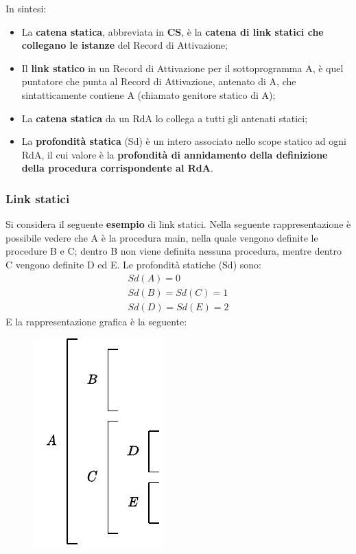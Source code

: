 \documentclass[a4paper]{article}
\begin{document}
	\noindent
	In sintesi:
	\begin{itemize}
		\item La \textbf{catena statica}, abbreviata in \textbf{CS}, è la \textbf{catena di link statici che collegano le istanze} del Record di Attivazione;
		
		\item Il \textbf{link statico} in un Record di Attivazione per il sottoprogramma A, è quel puntatore che punta al Record di Attivazione, antenato di A, che sintatticamente contiene A (chiamato genitore statico di A);
		
		\item La \textbf{catena statica} da un RdA lo collega a tutti gli antenati statici;
		
		\item La \textbf{profondità statica} (Sd) è un intero associato nello scope statico ad ogni RdA, il cui valore è la \textbf{profondità di annidamento della definizione della procedura corrispondente al RdA}.
	\end{itemize}\newpage
	
	\subsubsection{Link statici}
	
	Si considera il seguente \textcolor{Green4}{\textbf{esempio}} di link statici. Nella seguente rappresentazione è possibile vedere che A è la procedura \textsf{main}, nella quale vengono definite le procedure B e C; dentro B non viene definita nessuna procedura, mentre dentro C vengono definite D ed E. Le profondità statiche (Sd) sono:
	\begin{gather*}
		Sd\left(A\right) = 0 \\
		Sd\left(B\right) = Sd\left(C\right) = 1 \\
		Sd\left(D\right) = Sd\left(E\right) = 2
	\end{gather*}
	E la rappresentazione grafica è la seguente:
	\begin{figure}[!htp]
		\centering
		\includegraphics[width=.25\textwidth]{img/link-statici.pdf}
	\end{figure}
	
\end{document}
